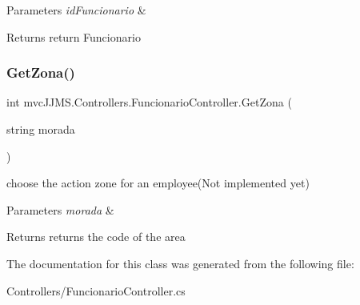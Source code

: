 \begin{DoxyParams}{Parameters}
{\em id\+Funcionario} & \\
\hline
\end{DoxyParams}
\begin{DoxyReturn}{Returns}
return Funcionario
\end{DoxyReturn}
\mbox{\label{classmvc_j_j_m_s_1_1_controllers_1_1_funcionario_controller_a3fc608b887a43ddf67041f09bab3aae5}} 
\subsubsection{\texorpdfstring{Get\+Zona()}{GetZona()}}
{\footnotesize\ttfamily int mvc\+J\+J\+M\+S.\+Controllers.\+Funcionario\+Controller.\+Get\+Zona (\begin{DoxyParamCaption}\item[{string}]{morada }\end{DoxyParamCaption})\hspace{0.3cm}{\ttfamily [inline]}}



choose the action zone for an employee(\+Not implemented yet) 


\begin{DoxyParams}{Parameters}
{\em morada} & \\
\hline
\end{DoxyParams}
\begin{DoxyReturn}{Returns}
returns the code of the area
\end{DoxyReturn}


The documentation for this class was generated from the following file\+:\begin{DoxyCompactItemize}
\item 
Controllers/Funcionario\+Controller.\+cs\end{DoxyCompactItemize}

